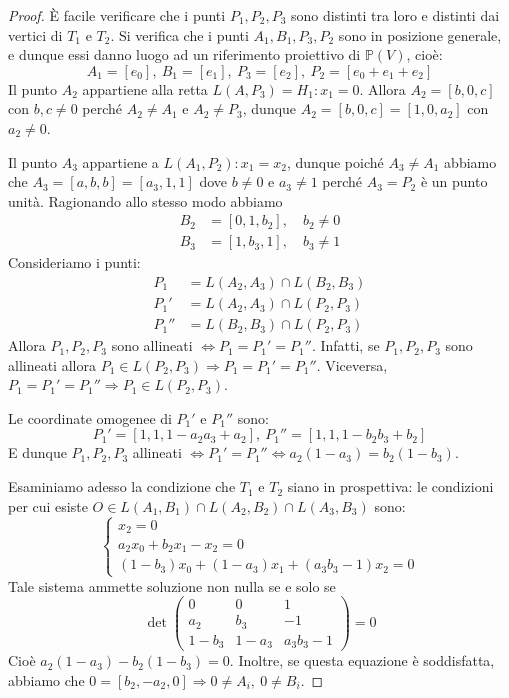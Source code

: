 \begin{proof}
È facile verificare che i punti $P_1,P_2,P_3$ sono distinti tra loro e distinti dai vertici di $T_1$ e $T_2$. Si verifica che i punti $A_1, B_1, P_3, P_2$ sono in posizione generale, e dunque essi danno luogo ad un riferimento proiettivo di $\mathbb{P}(V)$, cioè:
$$A_1=[e_0],\ B_1=[e_1],\ P_3=[e_2],\ P_2=[e_0+e_1+e_2]$$
Il punto $A_2$ appartiene alla retta $L(A,P_3)=H_1:x_1=0$. Allora $A_2=[b,0,c]$ con $b,c \neq 0$ perché $A_2 \neq A_1$ e $A_2 \neq P_3$, dunque $A_2=[b,0,c]=[1,0,a_2]$ con $a_2 \neq 0$.

Il punto $A_3$ appartiene a $L(A_1,P_2):x_1=x_2$, dunque poiché $A_3 \neq A_1$ abbiamo che $A_3=[a,b,b]=[a_3,1,1]$ dove $b \neq 0$ e $a_3 \neq 1$ perché $A_3=P_2$ è un punto unità. Ragionando allo stesso modo abbiamo
\begin{align*}
B_2&=[0,1,b_2], \quad b_2 \neq 0\\
B_3&=[1,b_3,1], \quad b_3 \neq 1
\end{align*}
Consideriamo i punti:
\begin{align*}
P_1&=L(A_2,A_3)\cap L(B_2,B_3)\\
P_1'&=L(A_2,A_3)\cap L(P_2,P_3)\\
P_1''&=L(B_2,B_3)\cap L(P_2,P_3)
\end{align*}
Allora $P_1,P_2,P_3$ sono allineati $\Leftrightarrow P_1=P_1'=P_1''$. Infatti, se $P_1, P_2, P_3$ sono allineati allora $P_1 \in L(P_2,P_3) \Rightarrow P_1=P_1'=P_1''$. Viceversa, $P_1=P_1'=P_1'' \Rightarrow P_1 \in L(P_2,P_3)$.

Le coordinate omogenee di $P_1'$ e $P_1''$ sono:
$$P_1'=[1,1,1-a_2a_3+a_2],\ P_1''=[1,1,1-b_2b_3+b_2]$$
E dunque $P_1,P_2,P_3$ allineati $\Leftrightarrow P_1'=P_1'' \Leftrightarrow a_2(1-a_3)=b_2(1-b_3)$.

Esaminiamo adesso la condizione che $T_1$ e $T_2$ siano in prospettiva: le condizioni per cui esiste $O \in L(A_1,B_1)\cap L(A_2,B_2)\cap L(A_3,B_3)$ sono:
$$\begin{cases}
x_2=0\\
a_2x_0+b_2x_1-x_2=0\\
(1-b_3)x_0+(1-a_3)x_1+(a_3b_3-1)x_2=0
\end{cases}$$
Tale sistema ammette soluzione non nulla se e solo se
$$\det \begin{pmatrix}
0 & 0 & 1 \\ a_2 & b_3 & -1 \\ 1-b_3 & 1-a_3 & a_3b_3-1
\end{pmatrix}=0$$
Cioè $a_2(1-a_3)-b_2(1-b_3)=0$. Inoltre, se questa equazione è soddisfatta, abbiamo che $0=[b_2,-a_2,0] \Rightarrow 0 \neq A_i,\ 0 \neq B_i$.
\end{proof}

